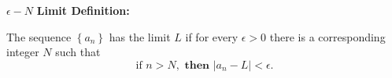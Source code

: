 \documentclass[10pt]{article}
\begin{document}
\(\epsilon - N\) \textbf{Limit Definition:}

The sequence \(\left\lbrace a_n \right\rbrace\) has the limit \(L\) if for every \(\epsilon>0\) there is a corresponding integer \(N\) such that\\
\[
\text{if } n > N, \textbf{ then } |a_n - L| < \epsilon.
\]
~\\


%
%
%

\end{document}
